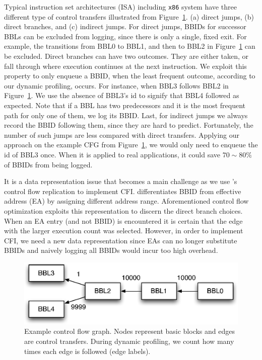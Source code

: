 Typical instruction set architectures (ISA) including {\tt x86} system have
three different type of control transfers illustrated from
Figure~\ref{fig:cfg0}. (a) direct jumps, (b) direct branches, and (c) indirect
jumps. For direct jumps, BBIDs for successor BBLs can be excluded from logging,
since there is only a single, fixed exit. For example, the transitions from
BBL0 to BBL1, and then to BBL2 in Figure~\ref{fig:cfg0} can be excluded. Direct
branches can have two outcomes.  They are either taken, or fall through where
execution continues at the next instruction. We exploit this property to only
enqueue a BBID, when the least frequent outcome, according to our dynamic
profiling, occurs. For instance, when BBL3 follows BBL2 in
Figure~\ref{fig:cfg0}. We use the absence of BBL3’s id to signify that BBL4
followed as expected. Note that if a BBL has two predecessors and it is the
most frequent path for only one of them, we log its BBID. Last, for indirect
jumps we always record the BBID following them, since they are hard to predict.
Fortunately, the number of such jumps are less compared with direct transfers.
%
Applying our approach on the example CFG from Figure~\ref{fig:cfg0}, we would
only need to enqueue the id of BBL3 once. When it is applied to real
applications, it could save $70 \sim 80 \%$ of BBIDs from being logged.

It is a data representation issue that becomes a main challenge as we use
\sreplica's control flow replication to implement CFI. \sreplica differentiates
BBID from effective address (EA) by assigning different address range.
Aforementioned control flow optimization exploits this representation to
discern the direct branch choices. 
%
When an EA entry (and not BBID) is encountered it is certain that the edge with
the larger execution count was selected.  However, in order to implement CFI,
we need a new data representation since EAs can no longer substitute BBIDs and
naively logging all BBIDs would incur too high overhead.

\begin{figure}[tb]
    \centering
    \includegraphics[width=0.64\linewidth]{figs/cfg0.eps}
    \caption{Example control flow graph. Nodes represent basic blocks and edges
    are control transfers. During dynamic profiling, we count how many times
    each edge is followed (edge labels). \label{fig:cfg0}}
\end{figure}

